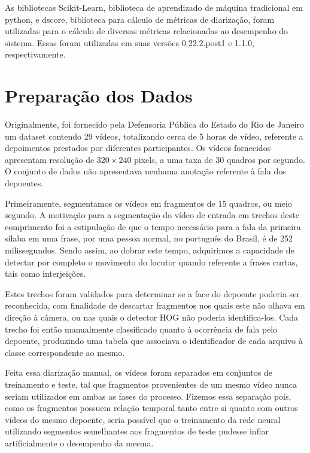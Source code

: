 As bibliotecas Scikit-Learn\cite{pedregosaScikitlearnMachineLearning2011}, biblioteca de aprendizado de máquina tradicional em python, e dscore\cite{ryantNryantDscore2020}, biblioteca para cálculo de métricas de diarização, foram utilizadas para o cálculo de diversas métricas relacionadas ao desempenho do sistema.
Essas foram utilizadas em suas versões 0.22.2.post1 e 1.1.0, respectivamente.

\section{Preparação dos Dados}
\label{sec:preproc}

Originalmente, foi fornecido pela Defensoria Pública do Estado do Rio de Janeiro um dataset contendo 29 vídeos, totalizando cerca de 5 horas de vídeo, referente a depoimentos prestados por diferentes participantes.
Os vídeos fornecidos apresentam resolução de $320\times240$ pixels, a uma taxa de 30 quadros por segundo.
O conjunto de dados não apresentava nenhuma anotação referente à fala dos depoentes.

Primeiramente, segmentamos os vídeos em fragmentos de 15 quadros, ou meio segundo.
A motivação para a segmentação do vídeo de entrada em trechos deste comprimento foi a estipulação de que o tempo necessário para a fala da primeira sílaba em uma frase, por uma pessoa normal, no português do Brasil, é de 252 milissegundos\cite{barbosaSyllabletimingBrazilianPortuguese2000}.
Sendo assim, ao dobrar este tempo, adquirimos a capacidade de detectar por completo o movimento do locutor quando referente a frases curtas, tais como interjeições.

Estes trechos foram validados para determinar se a face do depoente poderia ser reconhecida, com finalidade de descartar fragmentos nos quais este não olhava em direção à câmera, ou nas quais o detector HOG não poderia identifica-los.
Cada trecho foi então manualmente classificado quanto à ocorrência de fala pelo depoente, produzindo uma tabela que associava o identificador de cada arquivo à classe correspondente ao mesmo.

Feita essa diarização manual, os vídeos foram separados em conjuntos de treinamento e teste, tal que fragmentos provenientes de um mesmo vídeo nunca seriam utilizados em ambas as fases do processo.
Fizemos essa separação pois, como os fragmentos possuem relação temporal tanto entre si quanto com outros vídeos do mesmo depoente, seria possível que o treinamento da rede neural utilizando segmentos semelhantes aos fragmentos de teste pudesse inflar artificialmente o desempenho da mesma.

